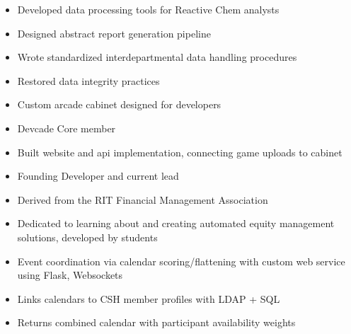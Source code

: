 \documentclass[10pt,a4paper,ragged2e,withhyper]{altacv}
\begin{document}
\begin{paracol}{2}


\begin{itemize}
    \item Developed data processing tools for Reactive Chem analysts
    \item Designed abstract report generation pipeline
    \item Wrote standardized interdepartmental data handling procedures
    \item Restored data integrity practices
\end{itemize}


\begin{itemize}
    \item Custom arcade cabinet designed for developers
    \item Devcade Core member
    \item Built website and api implementation, connecting game uploads to cabinet
\end{itemize}\par


\divider

\begin{itemize}
    \item Founding Developer and current lead
    \item Derived from the RIT Financial Management Association
    \item Dedicated to learning about and creating automated equity management solutions, developed by students
\end{itemize}

\divider

\begin{itemize}
    \item Event coordination via calendar scoring/flattening with custom web service using Flask, Websockets
    \item Links calendars to CSH member profiles with LDAP + SQL
    \item Returns combined calendar with participant availability weights
\end{itemize}


\end{paracol}
\end{document}
